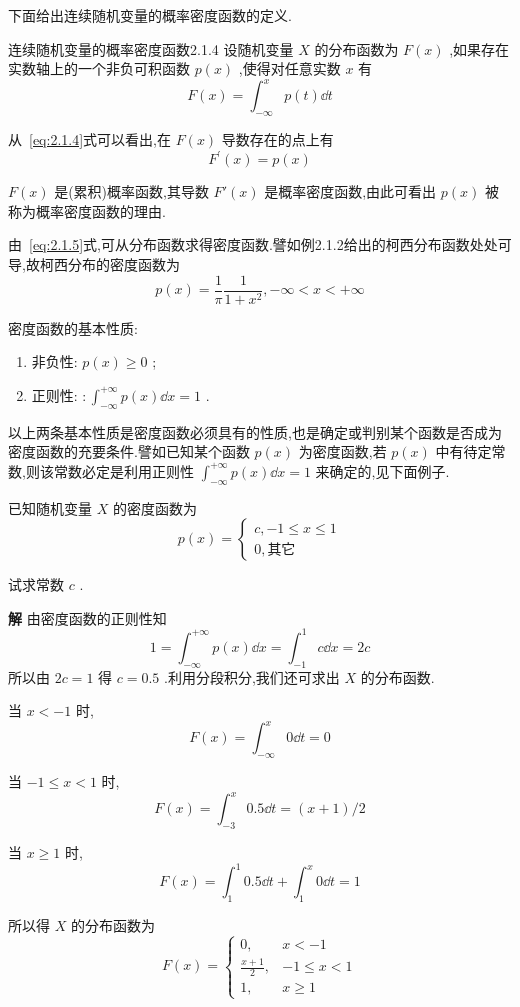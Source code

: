 下面给出连续随机变量的概率密度函数的定义.

\begin{definition}{连续随机变量的概率密度函数}{2.1.4}
	设随机变量 $ X $ 的分布函数为 $ F(x) $ ,如果存在实数轴上的一个非负可积函数 $ p(x) $ ,使得对任意实数 $ x $ 有
	\begin{equation} 
	F(x)=\int_{-\infty}^{x} p(t) \dd t \label{eq:2.1.4}
	\end{equation}
	
	从~\ref{eq:2.1.4}式可以看出,在 $ F(x) $ 导数存在的点上有
	\begin{equation} 
	F^{\prime}(x)=p(x) \label{eq:2.1.5}
	\end{equation}
	
	 $ F(x) $ 是(累积)概率函数,其导数 $ F'(x) $ 是概率密度函数,由此可看出 $ p(x) $ 被称为概率密度函数的理由.
	
	由~\ref{eq:2.1.5}式,可从分布函数求得密度函数.譬如例2.1.2给出的柯西分布函数处处可导,故柯西分布的密度函数为	
	\[ 
	p(x)=\frac{1}{\pi} \frac{1}{1+x^{2}},-\infty<x<+\infty
	\]
\end{definition}

密度函数的基本性质:
\begin{enumerate}
\item 非负性: $ p(x) \geqslant 0 $ ;
\item 正则性: $ : \int_{-\infty}^{+\infty} p(x) \dd x=1 $ .
\end{enumerate}

以上两条基本性质是密度函数必须具有的性质,也是确定或判别某个函数是否成为密度函数的充要条件.譬如已知某个函数 $ p(x) $ 为密度函数,若 $ p(x) $ 中有待定常数,则该常数必定是利用正则性 $ \int_{-\infty}^{+\infty} p(x) \dd x=1 $ 来确定的,见下面例子.

\begin{example}\label{exam:2.1.7}
	已知随机变量 $ X $ 的密度函数为
	\[ 
	p(x)=\left\{\begin{array}{ll}
	{c,-1 \leqslant x \leqslant 1} \\ 
	{0,\text{其它}}
	\end{array}\right.
	\]
	
	试求常数 $ c $ .
	
	\textbf{解} 由密度函数的正则性知
	\[ 
	1=\int_{-\infty}^{+\infty} p(x) \dd x=\int_{-1}^{1} c \dd x=2 c
	\]
	所以由 $ 2c=1 $ 得 $ c=0.5 $ .利用分段积分,我们还可求出 $ X $ 的分布函数.
	
	当 $ x<-1 $ 时,
	\[ 
	F(x)=\int_{-\infty}^{x} 0 \dd t=0
	\]
	
	当 $ -1 \leqslant x<1 $ 时,
	\[ 
	F(x)=\int_{-3}^{x} 0.5 \dd t=(x+1) / 2
	\]
	
	当 $ x \geqslant 1 $ 时,
	\[ 
	F(x)=\int_{1}^{1} 0.5 \dd t+\int_{1}^{x} 0 \dd t=1
	\]
	
	所以得 $ X $ 的分布函数为
	\[ 
	F(x)=\left\{\begin{array}{ll}
	{0,} & {x<-1} \\ 
	{\frac{x+1}{2},} & {-1 \leqslant x<1} \\ 
	{1,} & {x \geqslant 1}
	\end{array}\right.
	\]
	
\end{example}


